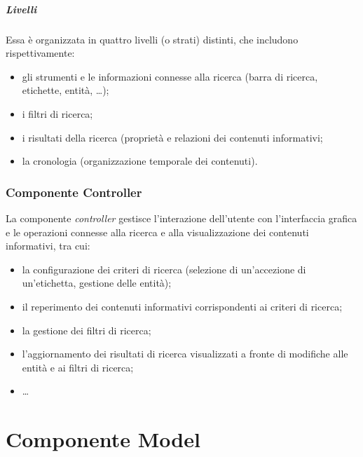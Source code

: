 \documentclass[10pt,a4paper,headinclude,footinclude,hidelinks]{scrreprt} %
\begin{document}
	\paragraph{Livelli}
	Essa è organizzata in quattro livelli (o strati) distinti, che includono rispettivamente:
	\begin{itemize}
	\item gli strumenti e le informazioni connesse alla ricerca (barra di ricerca, etichette, entità, \ldots);
	\item i filtri di ricerca;
	\item i risultati della ricerca (proprietà e relazioni dei contenuti informativi;
	\item la cronologia (organizzazione temporale dei contenuti).
	\end{itemize}

	\subsection{Componente Controller}
	\label{sec:stage:design:mvc:controller}
	La componente \textit{controller} gestisce l'interazione dell'utente con l'interfaccia grafica e le operazioni connesse alla ricerca e alla visualizzazione dei contenuti informativi, tra cui:
	\begin{itemize}
	\item la configurazione dei criteri di ricerca (selezione di un'accezione di un'etichetta, gestione delle entità);
	\item il reperimento dei contenuti informativi corrispondenti ai criteri di ricerca;
	\item la gestione dei filtri di ricerca;
	\item l'aggiornamento dei risultati di ricerca visualizzati a fronte di modifiche alle entità e ai filtri di ricerca;
	\item \ldots
	\end{itemize}

	\chapter{Componente Model}
	\label{ch:stage:design:model}
\end{document}
